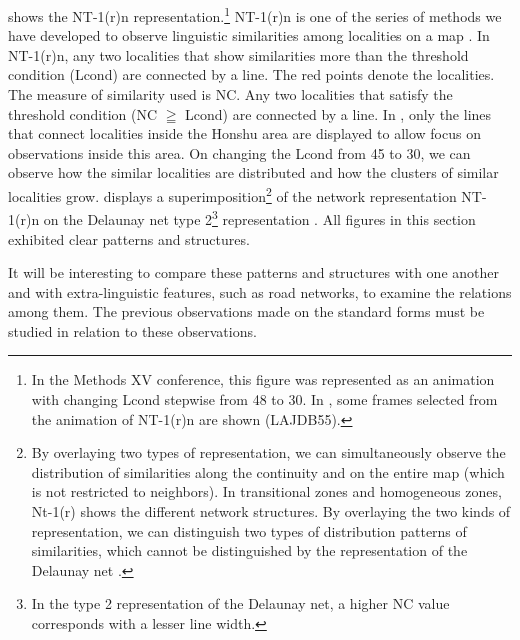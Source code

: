\documentclass[output=paper]{LSP/langsci}
\begin{document}
 shows the NT-1(r)n representation.\footnote{ In the Methods XV conference, this figure was represented as an animation with changing Lcond stepwise from 48 to 30. In , some frames selected from the animation of NT-1(r)n are shown (LAJDB55).} NT-1(r)n is one of the series of methods we have developed to observe linguistic similarities among localities on a map \citep[2]{kumagai_development_2013}. In NT-1(r)n, any two localities that show similarities more than the threshold condition (Lcond) are connected by a line. The red points denote the localities. The measure of similarity used is NC. Any two localities that satisfy the threshold condition (NC \textsf{${\geqq}$ }Lcond) are connected by a line. In , only the lines that connect localities inside the Honshu area are displayed to allow focus on observations inside this area. On changing the Lcond from 45 to 30, we can observe how the similar localities are distributed and how the clusters of similar localities grow.  displays a superimposition\footnote{By overlaying two types of representation, we can simultaneously observe the distribution of similarities along the continuity and on the entire map (which is not restricted to neighbors). In transitional zones and homogeneous zones, Nt-1(r) shows the different network structures. By overlaying the two kinds of representation, we can distinguish two types of distribution patterns of similarities, which cannot be distinguished by the representation of the Delaunay net \citep[7]{kumagai_development_2013}.} of the network representation NT-1(r)n on the Delaunay net type 2\footnote{ In the type 2 representation of the Delaunay net, a higher NC value corresponds with a lesser line width.} representation \citep[6--7]{kumagai_development_2013}. All figures in this section exhibited clear patterns and structures. 

It will be interesting to compare these patterns and structures with one another and with extra-linguistic features, such as road networks, to examine the relations among them. The previous observations made on the standard forms must be studied in relation to these observations.
\end{document}
